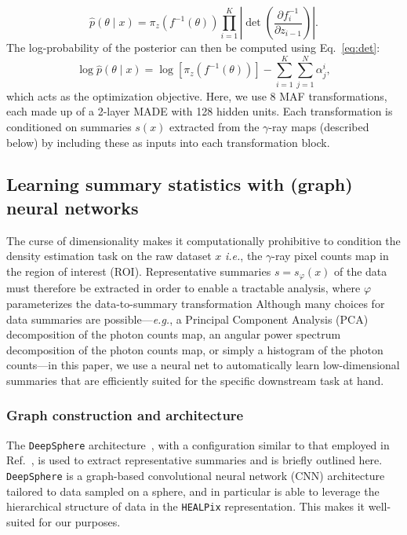 \documentclass[prd,aps,10pt,nofootinbib,twocolumn,superscriptaddress,preprintnumbers,balancelastpage,longbibliography]{revtex4-1}
\begin{document}
\begin{equation}
    \hat{p}({\theta} \mid {x})=\pi_{z}\left(f^{-1}({\theta})\right) \prod_{i=1}^{K}\left|\operatorname{det}\left(\frac{\partial f_{i}^{-1}}{\partial {z}_{i-1}}\right)\right|.
\end{equation}
The log-probability of the posterior can then be computed using Eq.~\eqref{eq:det}:
\begin{equation}
    \log \hat{p}({\theta} \mid {x}) = \log \left[\pi_{z}\left(f^{-1}({\theta})\right)\right]-\sum_{i=1}^{K} \sum_{j=1}^{N} \alpha_{j}^{i},
\end{equation}
which acts as the optimization objective. Here, we use 8 MAF transformations, each made up of a 2-layer MADE with 128 hidden units. Each transformation is conditioned on summaries $s(x)$ extracted from the $\gamma$-ray maps (described below) by including these as inputs into each transformation block. %

\subsection{Learning summary statistics with (graph) neural networks}

The curse of dimensionality makes it computationally prohibitive to condition the density estimation task on the raw dataset $x$ \emph{i.e.}, the $\gamma$-ray pixel counts map in the region of interest (ROI). Representative summaries $s = s_\varphi(x)$ of the data must therefore be extracted in order to enable a tractable analysis, where $\varphi$ parameterizes the data-to-summary transformation Although many choices for data summaries are possible---\emph{e.g.}, a Principal Component Analysis (PCA) decomposition of the photon counts map, an angular power spectrum decomposition of the photon counts map, or simply a histogram of the photon counts---in this paper, we use a neural net to automatically learn low-dimensional summaries that are efficiently suited for the specific downstream task at hand.

\subsubsection*{Graph construction and architecture}

The \texttt{DeepSphere} architecture~\cite{defferrard2020deepsphere,Perraudin:2018rbt,deepsphere_rlgm}, with a configuration similar to that employed in Ref.~\cite{List:2020mzd}, is used to extract representative summaries and is briefly outlined here. \texttt{DeepSphere} is a graph-based convolutional neural network (CNN) architecture tailored to data sampled on a sphere, and in particular is able to leverage the hierarchical structure of data in the \texttt{HEALPix} representation. This makes it well-suited for our purposes.
\end{document}
